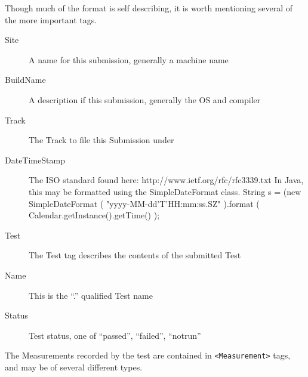 \documentclass{InsightBook}
\newcommand{\xmltag}[1]{\texttt{<#1>}}
\begin{document}
Though much of the format is self describing, it is worth mentioning
several of the more important tags.

\begin{description}
  \item[Site]{A name for this submission, generally a machine name}
  \item[BuildName]{A description if this submission, generally the OS
and compiler}
  \item[Track]{The Track to file this Submission under}
  \item[DateTimeStamp]{The ISO standard found here:
http://www.ietf.org/rfc/rfc3339.txt  In Java, this may be formatted
using the SimpleDateFormat class.  String s = (new
SimpleDateFormat ( "yyyy-MM-dd'T'HH:mm:ss.SZ" ).format (
Calendar.getInstance().getTime() );}
  \item[Test]{The Test tag describes the contents of the submitted
Test}
  \item[Name]{This is the ``.'' qualified Test name}
  \item[Status]{Test status, one of ``passed'', ``failed'',
``notrun''}
\end{description}

The Measurements recorded by the test are contained in \xmltag{Measurement}
tags, and may be of several different types.
\end{document}
